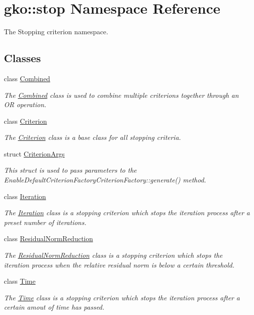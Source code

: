 \hypertarget{namespacegko_1_1stop}{}\section{gko\+:\+:stop Namespace Reference}
\label{namespacegko_1_1stop}


The Stopping criterion namespace.  


\subsection*{Classes}
\begin{DoxyCompactItemize}
\item 
class \hyperlink{classgko_1_1stop_1_1Combined}{Combined}
\begin{DoxyCompactList}\small\item\em The \hyperlink{classgko_1_1stop_1_1Combined}{Combined} class is used to combine multiple criterions together through an OR operation. \end{DoxyCompactList}\item 
class \hyperlink{classgko_1_1stop_1_1Criterion}{Criterion}
\begin{DoxyCompactList}\small\item\em The \hyperlink{classgko_1_1stop_1_1Criterion}{Criterion} class is a base class for all stopping criteria. \end{DoxyCompactList}\item 
struct \hyperlink{structgko_1_1stop_1_1CriterionArgs}{Criterion\+Args}
\begin{DoxyCompactList}\small\item\em This struct is used to pass parameters to the Enable\+Default\+Criterion\+Factory\+Criterion\+Factory\+::generate() method. \end{DoxyCompactList}\item 
class \hyperlink{classgko_1_1stop_1_1Iteration}{Iteration}
\begin{DoxyCompactList}\small\item\em The \hyperlink{classgko_1_1stop_1_1Iteration}{Iteration} class is a stopping criterion which stops the iteration process after a preset number of iterations. \end{DoxyCompactList}\item 
class \hyperlink{classgko_1_1stop_1_1ResidualNormReduction}{Residual\+Norm\+Reduction}
\begin{DoxyCompactList}\small\item\em The \hyperlink{classgko_1_1stop_1_1ResidualNormReduction}{Residual\+Norm\+Reduction} class is a stopping criterion which stops the iteration process when the relative residual norm is below a certain threshold. \end{DoxyCompactList}\item 
class \hyperlink{classgko_1_1stop_1_1Time}{Time}
\begin{DoxyCompactList}\small\item\em The \hyperlink{classgko_1_1stop_1_1Time}{Time} class is a stopping criterion which stops the iteration process after a certain amout of time has passed. \end{DoxyCompactList}\end{DoxyCompactItemize}

